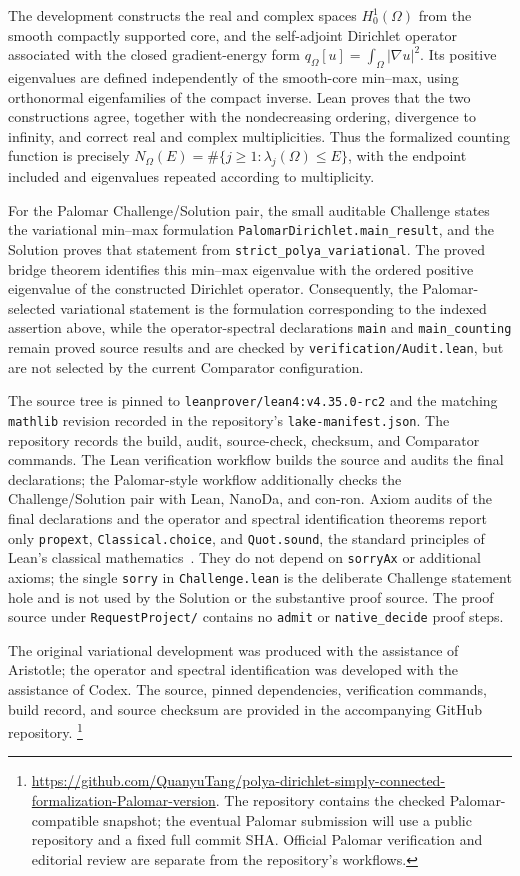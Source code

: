 \documentclass[11pt]{amsart}
\numberwithin{equation}{section}
\begin{document}
The development constructs the real and complex spaces $H_0^1(\Omega)$
from the smooth compactly supported core, and the self-adjoint
Dirichlet operator associated with the closed gradient-energy form
$q_\Omega[u]=\int_\Omega |\nabla u|^2$. Its positive eigenvalues are
defined independently of the smooth-core min--max, using orthonormal
eigenfamilies of the compact inverse. Lean proves that the two
constructions agree, together with the nondecreasing ordering,
divergence to infinity, and correct real and complex multiplicities.
Thus the formalized counting function is precisely
$N_\Omega(E)=\#\{j\ge1:\lambda_j(\Omega)\le E\}$, with the endpoint
included and eigenvalues repeated according to multiplicity.

For the Palomar Challenge/Solution pair, the small auditable Challenge
states the variational min--max formulation
\texttt{PalomarDirichlet.main\_result}, and the Solution proves that
statement from \texttt{strict\_polya\_variational}. The proved bridge theorem
identifies this
min--max eigenvalue with the ordered positive eigenvalue of the constructed
Dirichlet operator. Consequently, the Palomar-selected variational statement
is the formulation corresponding to the indexed assertion above, while the
operator-spectral declarations \texttt{main} and
\texttt{main\_counting} remain proved source results and are checked by
\texttt{verification/Audit.lean}, but are not selected by the current
Comparator configuration.

The source tree is pinned to
\texttt{leanprover/lean4:v4.35.0-rc2} and the matching \texttt{mathlib}
revision recorded in the repository's \texttt{lake-manifest.json}.
The repository records the build, audit, source-check, checksum, and
Comparator commands. The Lean verification workflow builds the source and
audits the final declarations; the Palomar-style workflow additionally checks
the Challenge/Solution pair with Lean, NanoDa, and con-ron. Axiom audits of
the final declarations and the operator and spectral identification
theorems report only \texttt{propext}, \texttt{Classical.choice}, and
\texttt{Quot.sound}, the standard principles of Lean's classical
mathematics~\cite{LeanAxioms}. They do not depend on \texttt{sorryAx} or
additional axioms; the single \texttt{sorry} in \texttt{Challenge.lean} is
the deliberate Challenge statement hole and is not used by the Solution or
the substantive proof source. The proof source under \texttt{RequestProject/}
contains no \texttt{admit} or \texttt{native\_decide} proof steps.

The original variational development was produced with the assistance
of Aristotle; the operator and spectral identification was developed
with the assistance of Codex. The source, pinned dependencies,
verification commands, build record, and source checksum are provided
in the accompanying GitHub repository.
\footnote{\url{https://github.com/QuanyuTang/polya-dirichlet-simply-connected-formalization-Palomar-version}.
The repository contains the checked Palomar-compatible snapshot; the
eventual Palomar submission will use a public repository and a fixed
full commit SHA. Official Palomar verification and editorial review are
separate from the repository's workflows.}
\end{document}
